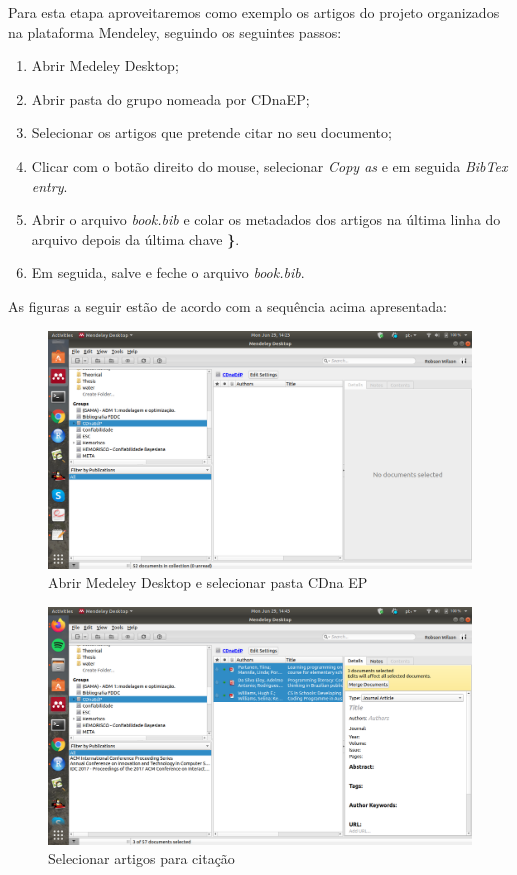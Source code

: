 \documentclass[
]{book}
\providecommand{\tightlist}{%
  \setlength{\itemsep}{0pt}\setlength{\parskip}{0pt}}
\begin{document}
Para esta etapa aproveitaremos como exemplo
os artigos do projeto organizados na
plataforma Mendeley, seguindo os
seguintes passos:

\begin{enumerate}
\def\labelenumi{\arabic{enumi}.}
\tightlist
\item
  Abrir Medeley Desktop;
\item
  Abrir pasta do grupo nomeada por CDnaEP;
\item
  Selecionar os artigos que pretende citar no seu documento;
\item
  Clicar com o botão direito do mouse, selecionar \emph{Copy as} e em seguida \emph{BibTex entry}.
\item
  Abrir o arquivo \emph{book.bib} e colar os metadados
  dos artigos na última linha do arquivo depois da
  última chave \textbf{\}}.
\item
  Em seguida, salve e feche o arquivo \emph{book.bib}.
\end{enumerate}

As figuras a seguir estão de acordo com a sequência acima apresentada:

\begin{figure}
\centering
\includegraphics{fig/open_mendeley.png}
\caption{Abrir Medeley Desktop e selecionar pasta CDna EP}
\end{figure}

\begin{figure}
\centering
\includegraphics{fig/mendeley_select_CDnaEP_paper_list.png}
\caption{Selecionar artigos para citação}
\end{figure}
\end{document}
